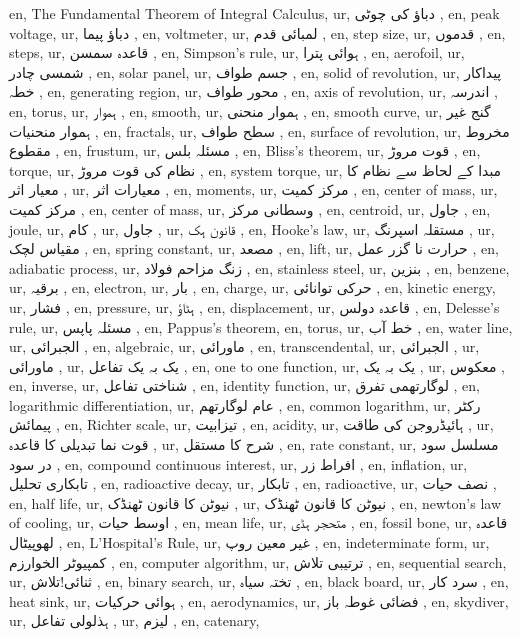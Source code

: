 en, The Fundamental Theorem of Integral Calculus,
ur, دباؤ کی چوٹی ,
en, peak voltage,
ur, دباؤ پیما  ,
en, voltmeter,
ur, لمبائی قدم ,
en, step size,
ur, قدموں ,
en, steps,
ur, قاعدہ سمسن ,
en, Simpson's rule,
ur, ہوائی پترا ,
en, aerofoil,
ur, شمسی چادر  ,
en, solar panel,
ur, جسم طواف ,
en, solid of revolution,
ur, پیداکار خطہ ,
en, generating region,
ur, محور طواف ,
en, axis of revolution,
ur, اندرسہ ,
en, torus,
ur, ہموار ,
en, smooth,
ur, ہموار منحنی ,
en, smooth curve,
ur, گنج غیر ہموار منحنیات ,
en, fractals,
ur, سطح طواف ,
en, surface of revolution,
ur, مخروط مقطوع ,
en, frustum,
ur, مسئلہ بلس  ,
en, Bliss's theorem,
ur, قوت مروڑ ,
en, torque,
ur, نظام کی قوت مروڑ ,
en, system torque,
ur, مبدا کے لحاظ سے نظام کا معیار اثر ,
ur, معیارات اثر ,
en, moments,
ur, مرکز کمیت ,
en, center of mass,
ur, مرکز کمیت ,
en, center of mass,
ur, وسطانی مرکز ,
en, centroid,
ur, جاول ,
en, joule,
ur, کام ,
ur, جاول ,
ur, قانون ہک ,
en, Hooke's law,
ur, مستقلہ اسپرنگ ,
ur, مقیاس لچک ,
en, spring constant,
ur, مصعد ,
en, lift,
ur, حرارت نا گزر عمل ,
en, adiabatic process,
ur, زنگ مزاحم فولاد ,
en, stainless steel,
ur, بنزین ,
en, benzene,
ur, برقیہ ,
en, electron,
ur, بار ,
en, charge,
ur, حرکی توانائی ,
en, kinetic energy,
ur, فشار ,
en, pressure,
ur, ہٹاؤ ,
en, displacement,
ur, قاعدہ دولس ,
en, Delesse's rule,
ur, مسئلہ پاپس ,
en, Pappus's theorem,
en, torus,
ur, خط آب  ,
en, water line,
ur, الجبرائی ,
en, algebraic,
ur, ماورائی ,
en, transcendental,
ur, الجبرائی ,
ur, ماورائی ,
ur, یک بہ یک تفاعل ,
en, one to one function,
ur, یک بہ یک ,
ur, معکوس ,
en, inverse,
ur, شناختی تفاعل ,
en, identity function,
ur, لوگارتھمی تفرق ,
en, logarithmic differentiation,
ur, عام لوگارتھم ,
en, common logarithm,
ur, رکٹر پیمائش ,
en, Richter scale,
ur, تیزابیت ,
en, acidity,
ur,  ہائیڈروجن کی طاقت ,
ur, قوت نما تبدیلی کا قاعدہ ,
ur, شرح کا مستقل ,
en, rate constant,
ur, مسلسل سود در سود ,
en, compound continuous interest,
ur, افراط زر ,
en, inflation,
ur, تابکاری تحلیل ,
en, radioactive decay,
ur, تابکار ,
en, radioactive,
ur, نصف حیات ,
en, half life,
ur, نیوٹن کا قانون ٹھنڈک ,
ur, نیوٹن کا قانون ٹھنڈک ,
en, newton's law of cooling,
ur, اوسط حیات ,
en, mean life,
ur, متحجر ہڈی ,
en, fossil bone,
ur, قاعدہ لھوپیٹال ,
en, L'Hospital's Rule,
ur, غیر معین روپ ,
en, indeterminate form,
ur, کمپیوٹر الخوارزم ,
en, computer algorithm,
ur, ترتیبی تلاش ,
en, sequential search,
ur, ثنائی!تلاش ,
en, binary search,
ur, تختہ سیاہ ,
en, black board,
ur, سرد کار ,
en, heat sink,
ur, ہوائی حرکیات ,
en, aerodynamics,
ur, فضائی غوطہ باز ,
en, skydiver,
ur, ہذلولی تفاعل ,
ur, لیزم ,
en, catenary,
